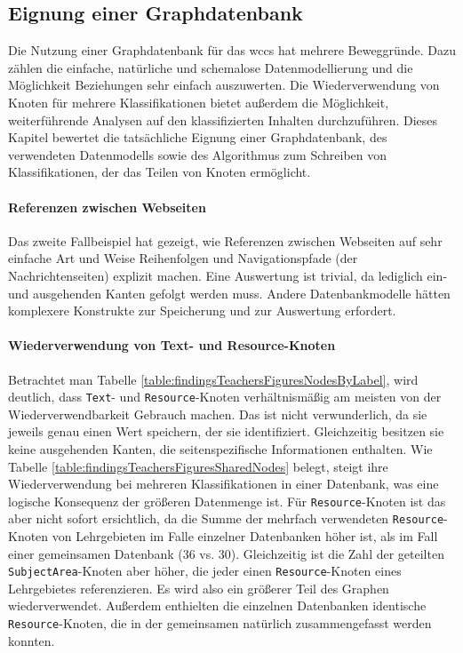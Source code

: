 \subsection{Eignung einer Graphdatenbank}
    Die Nutzung einer Graphdatenbank für das \gls{wccs} hat mehrere Beweggründe.
    Dazu zählen die einfache, natürliche und schemalose Datenmodellierung
    und die Möglichkeit Beziehungen sehr einfach auszuwerten.
    Die Wiederverwendung von Knoten für mehrere Klassifikationen
    bietet außerdem die Möglichkeit, weiterführende Analysen auf den
    klassifizierten Inhalten durchzuführen.
    Dieses Kapitel bewertet die tatsächliche Eignung einer Graphdatenbank,
    des verwendeten Datenmodells sowie des Algorithmus
    zum Schreiben von Klassifikationen, der das Teilen von Knoten ermöglicht.

    \paragraph{Referenzen zwischen Webseiten}
    Das zweite Fallbeispiel hat gezeigt,
    wie Referenzen zwischen Webseiten auf sehr einfache Art und Weise
    Reihenfolgen und Navigationspfade (der Nachrichtenseiten) explizit machen.
    Eine Auswertung ist trivial, da lediglich ein- und ausgehenden Kanten gefolgt werden muss.
    Andere Datenbankmodelle hätten komplexere Konstrukte
    zur Speicherung und zur Auswertung erfordert.

    \paragraph{Wiederverwendung von Text- und Resource-Knoten}
    Betrachtet man Tabelle \ref{table:findingsTeachersFiguresNodesByLabel}, wird deutlich,
    dass \texttt{Text}- und \texttt{Resource}-Knoten verhältnismäßig am meisten von der
    Wiederverwendbarkeit Gebrauch machen.
    Das ist nicht verwunderlich, da sie jeweils genau einen Wert speichern,
    der sie identifiziert.
    Gleichzeitig besitzen sie keine ausgehenden Kanten,
    die seitenspezifische Informationen enthalten.
    Wie Tabelle \ref{table:findingsTeachersFiguresSharedNodes} belegt,
    steigt ihre Wiederverwendung bei mehreren Klassifikationen in einer Datenbank,
    was eine logische Konsequenz der größeren Datenmenge ist.
    Für \texttt{Resource}-Knoten ist das aber nicht sofort ersichtlich, da
    die Summe der mehrfach verwendeten \texttt{Resource}-Knoten von Lehrgebieten
    im Falle einzelner Datenbanken höher ist, als im Fall einer gemeinsamen Datenbank (36 vs. 30).
    Gleichzeitig ist die Zahl der geteilten \texttt{SubjectArea}-Knoten aber höher,
    die jeder einen \texttt{Resource}-Knoten eines Lehrgebietes referenzieren.
    Es wird also ein größerer Teil des Graphen wiederverwendet.
    Außerdem enthielten die einzelnen Datenbanken identische \texttt{Resource}-Knoten,
    die in der gemeinsamen natürlich zusammengefasst werden konnten.

